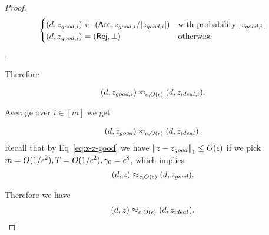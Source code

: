 \begin{proof}
$$\begin{cases}
                     (d,z_{good,i}) \leftarrow (\mathsf{Acc}, z_{good,i}/|z_{good,i}|) & \text{with probability } |z_{good,i}|\\
                    (d,z_{good,i}) = (\mathsf{Rej},\bot)  & \text{otherwise }
                \end{cases}$$.




Therefore

\begin{align}
    (d,z_{good,i})\approx_{c, O(\epsilon)}(d,z_{ideal,i}).
\end{align}

Average over $i\in[m]$ we get

\begin{align}
    (d,z_{good})\approx_{c, O(\epsilon)}(d,z_{ideal}).
\end{align}
Recall that by Eq~\ref{eq:z-z-good} we have $\left\lVert z-z_{good}\right\rVert_1 \leq O(\epsilon)$ if we pick $m=O(1/\epsilon^2), T=O(1/\epsilon^2),\gamma_0=\epsilon^8$, which implies
\begin{align}
    (d,z)\approx_{c, O(\epsilon)}(d,z_{good}).
\end{align}

Therefore  we have  
\begin{align}
     (d,z)\approx_{c, O(\epsilon)}(d,z_{ideal}).
\end{align}

 
\end{proof}







